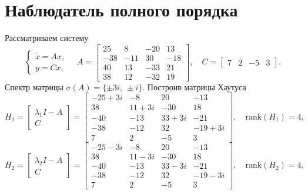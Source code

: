 \section{Наблюдатель полного порядка}

Рассматриваем систему
\begin{equation}
    \begin{cases}
        \dot x = Ax,\\
        y = Cx,
    \end{cases}\quad
    A=\begin{bmatrix}
        25& 8& -20& 13\\
        -38& -11& 30& -18\\
        40& 13& -33& 21\\
        38& 12& -32& 19
    \end{bmatrix},\quad
    C=\begin{bmatrix}
        7&2&-5&3
    \end{bmatrix}.
    \label{eq:2}
\end{equation}
Спектр матрицы $\sigma(A)= \{\pm3i,\ \pm i\}.$ Построив матрицы Хаутуса
\begin{equation*}
H_1 = \begin{bmatrix}
    \lambda_1 I - A \\ C
    \end{bmatrix} =
\begin{bmatrix}
-25 + 3i & -8 & 20 & -13 \\
38 & 11 + 3i & -30 & 18 \\
-40 & -13 & 33 + 3i & -21 \\
-38 & -12 & 32 & -19 + 3i \\
7 & 2 & -5 & 3
\end{bmatrix},\quad
\text{rank}(H_1) = 4,
\end{equation*}
\begin{equation*}
H_2 = \begin{bmatrix}
    \lambda_2 I - A \\ C
    \end{bmatrix} =
\begin{bmatrix}
-25 - 3i & -8 & 20 & -13 \\
38 & 11 - 3i & -30 & 18 \\
-40 & -13 & 33 - 3i & -21 \\
-38 & -12 & 32 & -19 - 3i \\
7 & 2 & -5 & 3
\end{bmatrix},\quad
\text{rank}(H_2) = 4,
\end{equation*}
